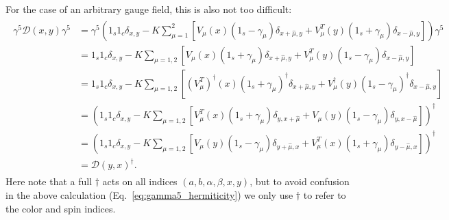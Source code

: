 For the case of an arbitrary gauge field, this is also not too difficult:
\begin{align}\begin{split}
	\gamma^5 \mathcal D(x, y) \gamma^5 &= \gamma^5\left( 1_s 1_c \delta_{x, y} - K \sum_{\mu = 1}^2 \left[ V_\mu(x) (1_s - \gamma_\mu) \delta_{x + \hat\mu, y} + V_\mu^T(y) (1_s + \gamma_\mu) \delta_{x - \hat\mu, y} \right] \right) \gamma^5 \\
	&= 1_s 1_c \delta_{x, y} - K \sum_{\mu = 1, 2} \left[ V_\mu(x) (1_s + \gamma_\mu) \delta_{x + \hat\mu, y} + V_\mu^T(y) (1_s - \gamma_\mu) \delta_{x - \hat\mu, y}  \right] \\
	&= 1_s 1_c \delta_{x, y} - K \sum_{\mu = 1, 2} \left[ (V_\mu^T)^\dagger(x) (1_s + \gamma_\mu)^\dagger \delta_{x + \hat\mu, y} + V_\mu^\dagger(y) (1_s - \gamma_\mu)^\dagger \delta_{x - \hat\mu, y}  \right] \\
	&= \left(1_s 1_c \delta_{x, y} - K \sum_{\mu = 1, 2} \left[ V_\mu^T(x) (1_s + \gamma_\mu) \delta_{y, x + \hat\mu} + V_\mu(y) (1_s - \gamma_\mu) \delta_{y, x - \hat\mu}  \right] \right)^\dagger \\
	&= \left(1_s 1_c \delta_{x, y} - K \sum_{\mu = 1, 2} \left[ V_\mu(y) (1_s - \gamma_\mu) \delta_{y + \hat\mu, x} + V_\mu^T(x) (1_s + \gamma_\mu) \delta_{y - \hat\mu, x} \right] \right)^\dagger \\
	&= \mathcal D(y, x)^\dagger.
	\label{eq:gamma5_hermiticity}
\end{split}\end{align}
Here note that a full $\dagger$ acts on all indices $(a, b, \alpha, \beta, x, y)$, but to avoid confusion in the above calculation (Eq.~\eqref{eq:gamma5_hermiticity}) we only use $\dagger$ to refer to the color and spin indices. 

